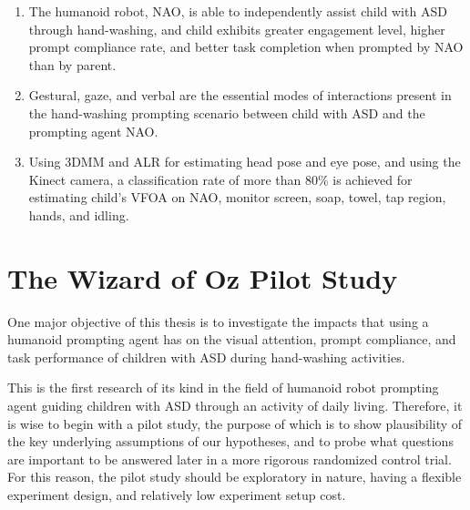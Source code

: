 \documentclass{ut-thesis}
\begin{document}


\begin{enumerate}
	\item The humanoid robot, NAO, is able to independently assist child with ASD through hand-washing, and child exhibits greater engagement level, higher prompt compliance rate, and better task completion when prompted by NAO than by parent.

	\item Gestural, gaze, and verbal are the essential modes of interactions present in the hand-washing prompting scenario between child with ASD and the prompting agent NAO.

	\item Using 3DMM and ALR for estimating head pose and eye pose, and using the Kinect camera, a classification rate of more than 80\% is achieved for estimating child's VFOA on NAO, monitor screen, soap, towel, tap region, hands, and idling.

\end{enumerate}

\chapter{The Wizard of Oz Pilot Study}


One major objective of this thesis is to investigate the impacts that using a humanoid prompting agent has on the visual attention, prompt compliance, and task performance of children with ASD during hand-washing activities.

This is the first research of its kind in the field of humanoid robot prompting agent guiding children with ASD through an activity of daily living.  Therefore, it is wise to begin with a pilot study, the purpose of which is to show plausibility of the key underlying assumptions of our hypotheses, and to probe what questions are important to be answered later in a more rigorous randomized control trial.  For this reason, the pilot study should be exploratory in nature, having a flexible experiment design, and relatively low experiment setup cost.
\end{document}
